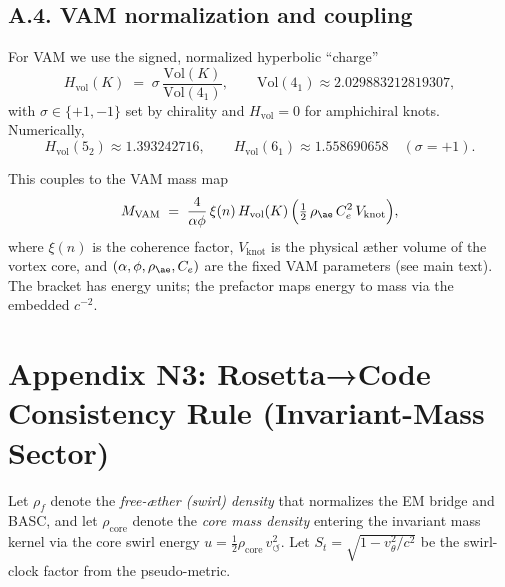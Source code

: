 \documentclass[10pt,reprint,aps,onecolumn,nofootinbib]{revtex4-2}
\begin{document}
    \subsection*{A.4. VAM normalization and coupling}
    For VAM we use the signed, normalized hyperbolic “charge”
    \begin{equation}
        H_{\mathrm{vol}}(K)\;=\;\sigma\,\frac{\mathrm{Vol}(K)}{\mathrm{Vol}(4_1)},
        \qquad \mathrm{Vol}(4_1)\approx 2.029883212819307,
        \label{eq:Hvol}
    \end{equation}
    with \(\sigma\in\{+1,-1\}\) set by chirality and \(H_{\mathrm{vol}}=0\) for amphichiral knots.
    Numerically,
    \[
        H_{\mathrm{vol}}(5_2)\approx 1.393242716,\qquad
        H_{\mathrm{vol}}(6_1)\approx 1.558690658
        \quad(\sigma=+1).
    \]

    This couples to the VAM mass map
    \begin{equation}
        M_{\mathrm{VAM}}
        \;=\;
        \frac{4}{\alpha\phi}\,\xi(n)\,
        H_{\mathrm{vol}}(K)\,
        \Big(\tfrac{1}{2}\,\rho_{\ae}\,C_e^2\,V_{\text{knot}}\Big),
        \label{eq:massmap}
    \end{equation}
    where \(\xi(n)\) is the coherence factor, \(V_{\text{knot}}\) is the physical æther volume of the vortex core, and \((\alpha,\phi,\rho_{\ae},C_e)\) are the fixed VAM parameters (see main text). The bracket has energy units; the prefactor maps energy to mass via the embedded \(c^{-2}\).



    \section*{Appendix N3: Rosetta→Code Consistency Rule (Invariant-Mass Sector)}

    \begin{definition}
        Let $\rho_f$ denote the \emph{free-æther (swirl) density} that normalizes the EM bridge and BASC, and let
        $\rho_{\text{core}}$ denote the \emph{core mass density} entering the invariant mass kernel via the core swirl energy
        $u = \tfrac{1}{2}\rho_{\text{core}}\,v_{\circlearrowleft}^2$.
        Let $S_t=\sqrt{1-v_\theta^2/c^2}$ be the swirl-clock factor from the pseudo-metric.
    \end{definition}
\end{document}
